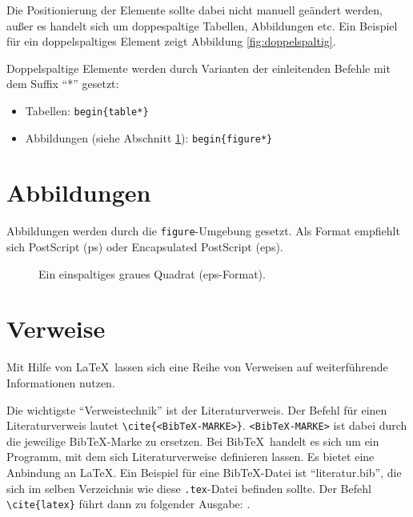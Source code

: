 \documentclass[ngerman]{ewks-latex}
\begin{document}
Die Positionierung der Elemente sollte dabei nicht manuell geändert werden, außer es handelt sich um doppespaltige Tabellen, Abbildungen etc. Ein Beispiel für ein doppelspaltiges Element zeigt Abbildung \ref{fig:doppelspaltig}.

Doppelspaltige Elemente werden durch Varianten der einleitenden Befehle mit dem Suffix "`*"' gesetzt:
\begin{itemize}
\item Tabellen: \texttt{begin\{table*\}}
\item Abbildungen (siehe Abschnitt \ref{sec:figures}): \texttt{begin\{figure*\}}
\end{itemize}

\section{Abbildungen}
\label{sec:figures}
Abbildungen werden durch die \texttt{figure}-Umgebung gesetzt. Als Format empfiehlt sich PostScript (ps) oder Encapsulated PostScript (eps).

\begin{figure}
\centering
{}
\caption{Ein einspaltiges graues Quadrat (eps-Format).}
\end{figure}

\begin{figure*}
\centering
{}
\caption{Ein doppelspaltiges graues Quadrat (eps-Format).}
\label{fig:doppelspaltig}
\end{figure*}

\section{Verweise}
Mit Hilfe von \LaTeX \ lassen sich eine Reihe von Verweisen auf weiterführende Informationen nutzen.

Die wichtigste "`Verweistechnik"' ist der Literaturverweis. Der Befehl für einen Literaturverweis lautet \texttt{\textbackslash cite\{<Bib\TeX-MARKE>\}}. \texttt{<Bib\TeX-MARKE>} ist dabei durch die jeweilige Bib\TeX-Marke zu ersetzen. Bei Bib\TeX \ handelt es sich um ein Programm, mit dem sich Literaturverweise definieren lassen. Es bietet eine Anbindung an \LaTeX. Ein Beispiel für eine Bib\TeX-Datei ist "`literatur.bib"', die sich im selben Verzeichnis wie diese \texttt{.tex}-Datei befinden sollte. Der Befehl \texttt{\textbackslash cite\{latex\}} führt dann zu folgender Ausgabe: \cite{latex}.
\end{document}
